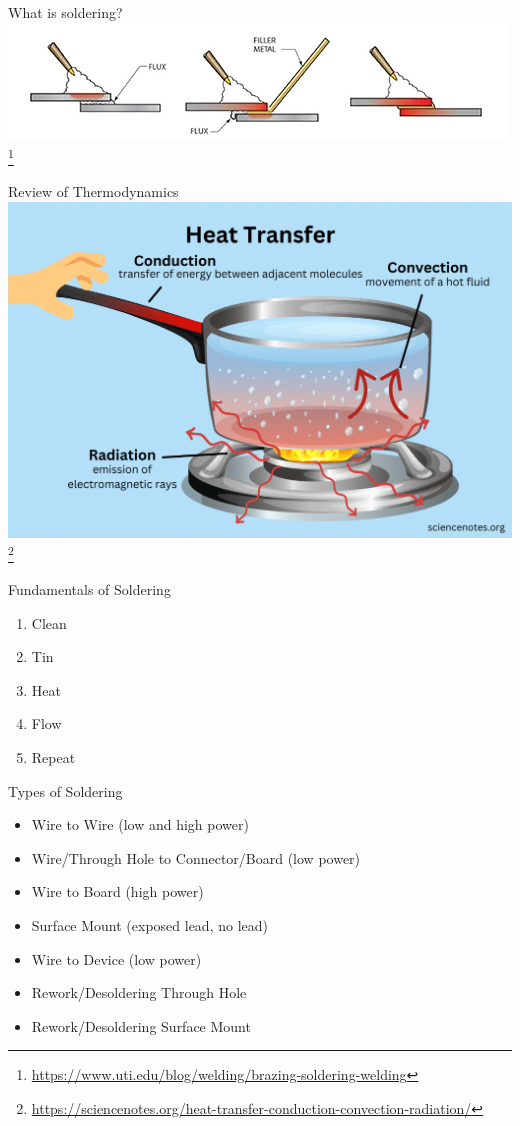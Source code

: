 \documentclass[aspectratio=169]{beamer}
\begin{document}
\begin{frame}{What is soldering?}
    \centering
    \includegraphics[width=0.8\linewidth]{soldering_brazing_welding.png} \footnote{\url{https://www.uti.edu/blog/welding/brazing-soldering-welding}}
\end{frame}
\begin{frame}{Review of Thermodynamics}
    \centering
    \includegraphics[height=0.8\textheight]{types_of_heat_transfer.png} \footnote{\url{https://sciencenotes.org/heat-transfer-conduction-convection-radiation/}}
\end{frame}
\begin{frame}{Fundamentals of Soldering}
    \begin{enumerate}
        \item Clean
        \item Tin
        \item Heat
        \item Flow
        \item Repeat
    \end{enumerate}
\end{frame}
\begin{frame}{Types of Soldering}
    \begin{itemize}
        \item Wire to Wire (low and high power)
        \item Wire/Through Hole to Connector/Board (low power)
        \item Wire to Board (high power)
        \item Surface Mount (exposed lead, no lead)
        \item Wire to Device (low power)
        \item Rework/Desoldering Through Hole
        \item Rework/Desoldering Surface Mount
    \end{itemize}
\end{frame}
\end{document}

